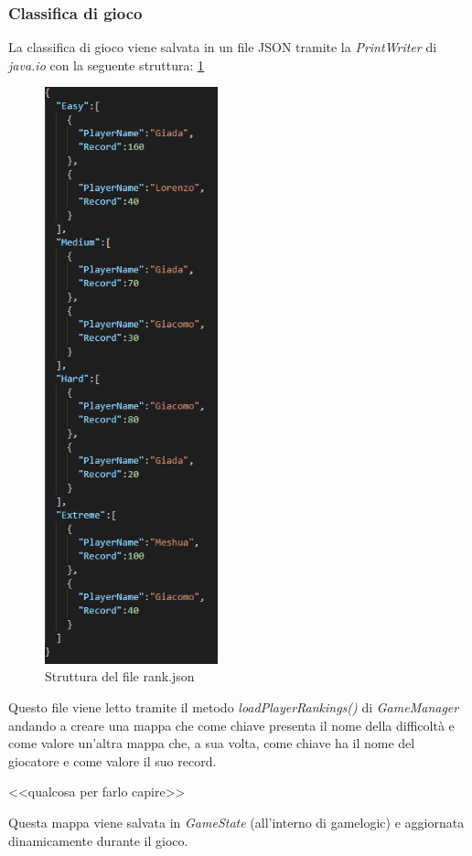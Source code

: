 \subsubsection{Classifica di gioco}
La classifica di gioco viene salvata in un file JSON tramite la \textit{PrintWriter} di \textit{java.io} con la seguente struttura: \ref{json}

\begin{figure}[H]
  \includegraphics[width=5cm]{../res/6-implementazione/chiana/json.png}
  \caption{Struttura del file rank.json}
  \label{json}
\end{figure}

Questo file viene letto tramite il metodo \textit{loadPlayerRankings()} di \textit{GameManager} andando a creare una mappa che come chiave presenta il nome della difficoltà e come valore un'altra mappa che, a sua volta, come chiave ha il nome del giocatore e come valore il suo record.

<<qualcosa per farlo capire>>

Questa mappa viene salvata in \textit{GameState} (all'interno di gamelogic) e aggiornata dinamicamente durante il gioco.

